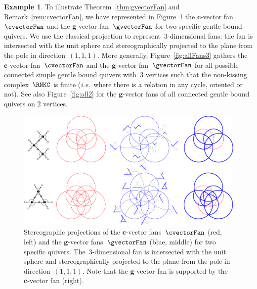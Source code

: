\documentclass{amsart}
\theoremstyle{definition}
\newtheorem{example}[theorem]{Example}
\renewcommand{\b}[1]{\mathbf{#1}} %
\newcommand{\fref}[1]{Figure~\ref{#1}} %
\newcommand{\ie}{\textit{i.e.}~} %
\begin{document}
\begin{example}
To illustrate Theorem~\ref{thm:gvectorFan} and Remark~\ref{rem:cvectorFan}, we have represented in \fref{fig:exmFans} the $\b{c}$-vector fan~$\cvectorFan$ and the $\b{g}$-vector fan~$\gvectorFan$ for two specific gentle bound quivers.
We use the classical projection to represent~$3$-dimensional fans: the fan is intersected with the unit sphere and stereographically projected to the plane from the pole in direction~$(1,1,1)$.
More generally, \fref{fig:allFans3} gathers the $\b{c}$-vector fan~$\cvectorFan$ and the $\b{g}$-vector fan~$\gvectorFan$ for all possible connected simple gentle bound quivers with~$3$ vertices such that the non-kissing complex~$\RNKC$ is finite (\ie where there is a relation in any cycle, oriented or not).
See also \fref{fig:all2} for the $\b{g}$-vector fans of all connected gentle bound quivers on $2$ vertices.

\begin{figure}[t]
	\capstart
	\centerline{\includegraphics[width=1.1\textwidth]{exmFans}}
	\caption{Stereographic projections of the $\b{c}$-vector fans~$\cvectorFan$ (red, left) and the $\b{g}$-vector fans~$\gvectorFan$ (blue, middle) for two specific quivers. The~$3$-dimensional fan is intersected with the unit sphere and stereographically projected to the plane from the pole in direction~$(1,1,1)$. Note that the $\b{g}$-vector fan is supported by the $\b{c}$-vector fan (right).}
	\label{fig:exmFans}
\end{figure}
\end{example}
\end{document}
